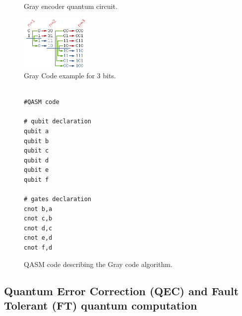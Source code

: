 \begin{figure}
    \centering


\label{fig:circuit_example}
\caption{Gray encoder quantum circuit.}
\end{figure}

\begin{figure}[htbp]
\centering
\includegraphics[width=0.3\textwidth]{figures/gray_code.png}
\caption{\label{fig:orgb57545f}
Gray Code example for 3 bits.}
\end{figure}

\begin{figure}
\centering
\begin{minipage}{.45\textwidth}

\begin{verbatim}

#QASM code

# qubit declaration
qubit a
qubit b
qubit c
qubit d
qubit e
qubit f

# gates declaration
cnot b,a
cnot c,b
cnot d,c
cnot e,d
cnot f,d

\end{verbatim}

\caption{QASM code describing the Gray code algorithm.}
\label{code:qasm_gray_code}
\end{minipage}
\end{figure}

\subsection*{Quantum Error Correction (QEC) and Fault Tolerant (FT) quantum computation}
\label{sec:org986eeca}

